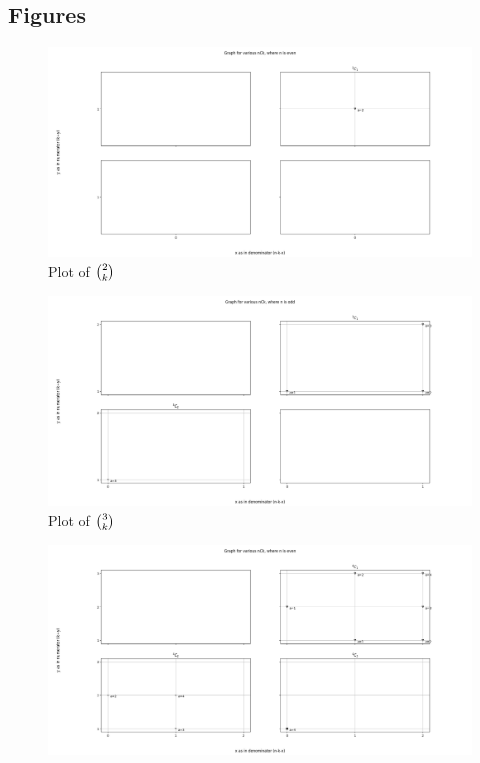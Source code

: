 \documentclass[PermutationsCombinationsWhyWholeNumber.tex]{subfiles}
\begin{document}
\begin{appendices}
\section{Figures}
\begin{figure}[ph!]
	\includegraphics[width=\linewidth]{2Ck.png}
	\caption{Plot of $\binom{2}{k}$}
	\label{2Ck}
\end{figure}
\begin{figure}[ph!]	
	\includegraphics[width=\linewidth]{3Ck.png}
	\caption{Plot of $\binom{3}{k}$}
	\label{3Ck}
\end{figure}
\begin{figure}[ph!]	
	\includegraphics[width=\linewidth]{4Ck.png}

\end{figure}
\end{appendices}
\end{document}
